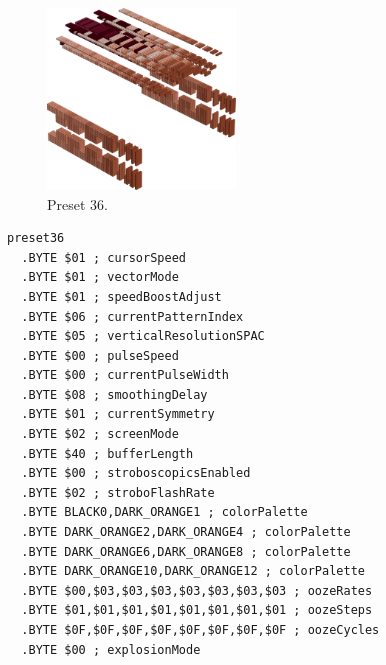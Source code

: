 \clearpage
\begin{minipage}[b]{0.48\linewidth}
\begin{figure}[H]                                                          
  \centering                                                             
  \begin{adjustbox}{width=5cm,center}                                   
  \includegraphics[width=5cm]{src/colorspace_presets/preset36-45.png}%
  \end{adjustbox}                                                        
\caption*{Preset 36.}                                           
\end{figure}                                                               
\end{minipage}
\hspace{0.1cm}
\begin{minipage}[b]{0.48\linewidth}                            
\begin{lstlisting}[basicstyle=\ttfamily\tiny]
preset36
  .BYTE $01 ; cursorSpeed
  .BYTE $01 ; vectorMode
  .BYTE $01 ; speedBoostAdjust
  .BYTE $06 ; currentPatternIndex
  .BYTE $05 ; verticalResolutionSPAC
  .BYTE $00 ; pulseSpeed
  .BYTE $00 ; currentPulseWidth
  .BYTE $08 ; smoothingDelay
  .BYTE $01 ; currentSymmetry
  .BYTE $02 ; screenMode
  .BYTE $40 ; bufferLength
  .BYTE $00 ; stroboscopicsEnabled
  .BYTE $02 ; stroboFlashRate
  .BYTE BLACK0,DARK_ORANGE1 ; colorPalette
  .BYTE DARK_ORANGE2,DARK_ORANGE4 ; colorPalette
  .BYTE DARK_ORANGE6,DARK_ORANGE8 ; colorPalette
  .BYTE DARK_ORANGE10,DARK_ORANGE12 ; colorPalette
  .BYTE $00,$03,$03,$03,$03,$03,$03,$03 ; oozeRates
  .BYTE $01,$01,$01,$01,$01,$01,$01,$01 ; oozeSteps
  .BYTE $0F,$0F,$0F,$0F,$0F,$0F,$0F,$0F ; oozeCycles
  .BYTE $00 ; explosionMode
\end{lstlisting}
\end{minipage}

\vspace*{0.3cm}

